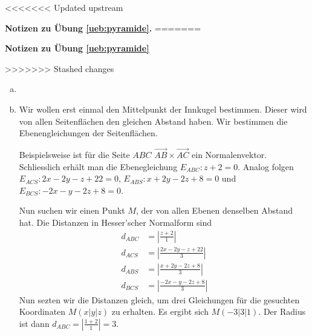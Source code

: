 \documentclass[%
11pt,%
twoside,%
titlepage,%
<<<<<<< Updated upstream
german,%
=======
swissgerman,%
>>>>>>> Stashed changes
headsepline%
]{scrartcl}
\newcommand{\faReturnGray}{\textcolor{gray}{\faMailReply}} %
\theoremstyle{definition}
\theoremstyle{plain}
\newcommand{\concatueb}[1]{ueb:#1}%
\newcommand{\concatlsg}[1]{lsg:#1}%
\newenvironment{lsg}[1]{%
<<<<<<< Updated upstream
    \par\noindent\textbf{Notizen zu Übung \ref{\concatueb{#1}}.}%
    \label{\concatlsg{#1}}
=======
    \par\noindent\textbf{Notizen zu Übung \ref{\concatueb{#1}}}\label{\concatlsg{#1}}
    \hfill\hyperref[\concatueb{#1}]{\faReturnGray}\par %
>>>>>>> Stashed changes
}{%
    \par%
}
\begin{document}
\begin{lsg}{pyramide}

\begin{enumerate}[a)]
    \item 

\begin{center}
\end{center}

\item Wir wollen erst einmal den Mittelpunkt der Innkugel bestimmen. Dieser wird von allen Seitenflächen den gleichen Abstand haben. Wir bestimmen die Ebenengleichungen der Seitenflächen.

Beispielsweise ist für die Seite $ABC$ $\vec{AB}\times\vec{AC}$ ein Normalenvektor. Schliesslich erhält man die Ebenegleichung $E_{ABC}:z+2=0$. Analog folgen $E_{ACS}:2x-2y-z+22=0$, $E_{ABS}:x+2y-2z+8=0$ und $E_{BCS}:-2x-y-2z+8=0$.

Nun suchen wir einen Punkt $M$, der von allen Ebenen denselben Abstand hat. Die Distanzen in  Hesser'scher Normalform sind
\begin{align}
    d_{ABC} &= \left|\frac{z+2}{1}\right|\\
    d_{ACS} &= \left|\frac{2x-2y-z+22}{3}\right|\\
    d_{ABS} &= \left|\frac{x+2y-2z+8}{3}\right|\\
    d_{BCS} &= \left|\frac{-2x-y-2z+8}{3}\right|
\end{align}
Nun sezten wir die Distanzen gleich, um drei Gleichungen für die gesuchten Koordinaten $M(x|y|z)$ zu erhalten. Es ergibt sich $M(-3|3|1)$. Der Radius ist dann $d_{ABC} = \left|\frac{1+2}{1}\right|=3$.
\end{enumerate}
\end{lsg}
\end{document}
